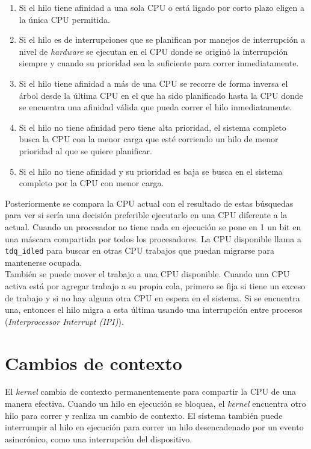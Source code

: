\documentclass[a4paper]{book}
\begin{document}
\begin{enumerate}
\item Si el hilo tiene afinidad a una sola CPU o está ligado por corto plazo eligen a la única CPU permitida.
\item Si el hilo es de interrupciones que se planifican por manejos de interrupción a nivel de \emph{hardware} se ejecutan en el CPU donde se originó la interrupción siempre y cuando su prioridad sea la suficiente para correr inmediatamente.
\item Si el hilo tiene afinidad a más de una CPU se recorre de forma inversa el árbol desde la \'ultima CPU en el que ha sido planificado hasta la CPU donde se encuentra una afinidad válida que pueda correr el hilo inmediatamente.
\item Si el hilo no tiene afinidad pero tiene alta prioridad, el sistema completo busca la CPU con la menor carga que esté corriendo un hilo de menor prioridad al que se quiere planificar.
\item Si el hilo no tiene afinidad y su prioridad es baja se busca en el sistema completo por la CPU con menor carga.
\end{enumerate}

Posteriormente se compara la CPU actual con el resultado de estas búsquedas para ver si sería una decisión preferible ejecutarlo en una CPU diferente a la actual.
Cuando un procesador no tiene nada en ejecución se pone en 1 un bit en una máscara compartida por todos los procesadores. La CPU disponible llama a \verb|tdq_idled| para buscar en otras CPU trabajos que puedan migrarse para mantenerse ocupada.\\

También se puede mover el trabajo a una CPU disponible. Cuando una CPU activa está por agregar trabajo a su propia cola, primero se fija si tiene un exceso de trabajo y si no hay alguna otra CPU en espera en el sistema. Si se encuentra una, entonces el hilo migra a esta última usando una interrupción entre procesos  (\emph{Interprocessor Interrupt (IPI)}).


\section{Cambios de contexto}

El \emph{kernel} cambia de contexto permanentemente para compartir la CPU de una manera efectiva. Cuando un hilo en ejecución se bloquea, el \emph{kernel} encuentra otro hilo para correr y realiza un cambio de contexto. El sistema también puede interrumpir al hilo en ejecución para correr un hilo desencadenado por un evento asincrónico, como una interrupción del dispositivo.\\
\end{document}
